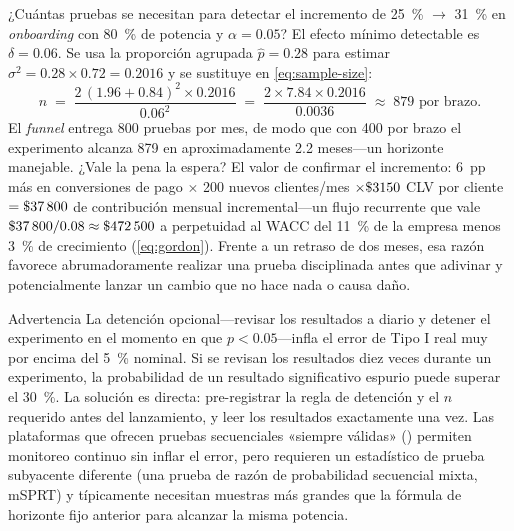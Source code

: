 \begin{example}
¿Cuántas pruebas se necesitan para detectar el incremento de \qty{25}{\percent} \(\to\)
\qty{31}{\percent} en \emph{onboarding} con \qty{80}{\percent} de potencia y \(\alpha=0.05\)?
El efecto mínimo detectable es \(\delta=0.06\). Se usa la proporción agrupada
\(\hat{p}=0.28\) para estimar \(\sigma^2 = 0.28\times 0.72 = 0.2016\) y se sustituye en
\cref{eq:sample-size}:
\[
  n \;=\; \frac{2\,(1.96+0.84)^{2}\times 0.2016}{0.06^{2}}
      \;=\; \frac{2\times 7.84 \times 0.2016}{0.0036}
      \;\approx\; \num{879} \text{ por brazo}.
\]
El \emph{funnel} entrega \num{800} pruebas por mes, de modo que con \num{400} por brazo el
experimento alcanza \num{879} en aproximadamente \num{2.2} meses---un horizonte manejable.
¿Vale la pena la espera? El valor de confirmar el incremento: \qty{6}{pp} más en conversiones
de pago \(\times\) \num{200} nuevos clientes/mes \(\times \$\num{3150}\) CLV por cliente
\(= \$\num{37800}\) de contribución mensual incremental---un flujo recurrente que vale
\(\$\num{37800}/0.08 \approx \$\num{472500}\) a perpetuidad al WACC del \qty{11}{\percent}
de la empresa menos \qty{3}{\percent} de crecimiento (\cref{eq:gordon}). Frente a un retraso
de dos meses, esa razón favorece abrumadoramente realizar una prueba disciplinada antes que
adivinar y potencialmente lanzar un cambio que no hace nada o causa daño.
\end{example}

\begin{admonition}{Advertencia}
La detención opcional---revisar los resultados a diario y detener el experimento en el momento
en que \(p<0.05\)---infla el error de Tipo I real muy por encima del \qty{5}{\percent} nominal.
Si se revisan los resultados diez veces durante un experimento, la probabilidad de un resultado
significativo espurio puede superar el \qty{30}{\percent}. La solución es directa: pre-registrar
la regla de detención y el \(n\) requerido antes del lanzamiento, y leer los resultados exactamente
una vez. Las plataformas que ofrecen pruebas secuenciales «siempre válidas» (\textcite{johari2022always})
permiten monitoreo continuo sin inflar el error, pero requieren un estadístico de prueba
subyacente diferente (una prueba de razón de probabilidad secuencial mixta, mSPRT) y típicamente
necesitan muestras más grandes que la fórmula de horizonte fijo anterior para alcanzar la misma
potencia.
\end{admonition}


